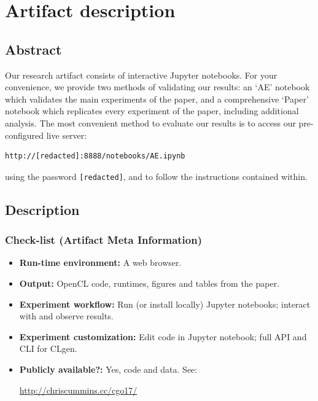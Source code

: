 \appendix

\section{Artifact description}

\subsection{Abstract}

Our research artifact consists of interactive Jupyter notebooks. For your convenience, we provide two methods of validating our results: an `AE' notebook which validates the main experiments of the paper, and a comprehensive `Paper' notebook which replicates every experiment of the paper, including additional analysis. The most convenient method to evaluate our results is to access our pre-configured live server:
\begin{verbatim}
http://[redacted]:8888/notebooks/AE.ipynb
\end{verbatim}
using the password \texttt{[redacted]}, and to follow the instructions contained within.

\subsection{Description}

\subsubsection{Check-list (Artifact Meta Information)}

{\small
  \begin{itemize}
    \item {\bf Run-time environment: }A web browser.%
    \item {\bf Output: }OpenCL code, runtimes, figures and tables from the paper.
    \item {\bf Experiment workflow: }Run (or install locally) Jupyter notebooks; interact with and observe results.
    \item {\bf Experiment customization: }Edit code in Jupyter notebook; full API and CLI for CLgen.
    \item {\bf Publicly available?: }Yes, code and data. See:
    
    \url{http://chriscummins.cc/cgo17/}
  \end{itemize}
}

